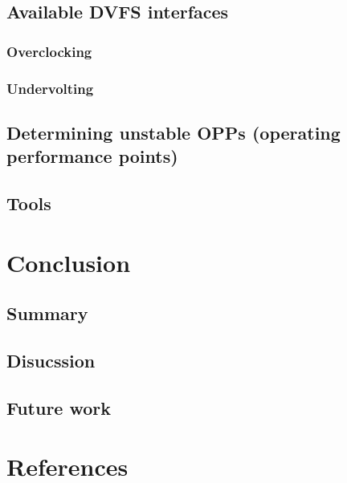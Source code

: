 \documentclass[12pt]{article}
\begin{document}
\subsection{Available DVFS interfaces}

\subsubsection{Overclocking}

\subsubsection{Undervolting}

\subsection{Determining unstable OPPs (operating performance points)}

\subsection{Tools}

\section{Conclusion}

\subsection{Summary}

\subsection{Disucssion}

\subsection{Future work}

\section{References}
\end{document}
